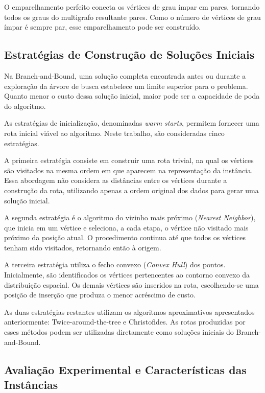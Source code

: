 \documentclass[12pt]{article}
\begin{document}
O emparelhamento perfeito conecta os vértices de grau ímpar em pares,
tornando todos os graus do multigrafo resultante pares. Como o número
de vértices de grau ímpar é sempre par, esse emparelhamento pode ser
construído.




\subsection{Estratégias de Construção de Soluções Iniciais}

Na Branch-and-Bound, uma solução completa encontrada antes ou durante
a exploração da árvore de busca estabelece um limite superior para
o problema. Quanto menor o custo dessa solução inicial, maior pode
ser a capacidade de poda do algoritmo.

As estratégias de inicialização,  denominadas \textit{warm
starts}, permitem fornecer uma rota inicial viável ao algoritmo.
Neste trabalho, são consideradas cinco estratégias.

A primeira estratégia consiste em construir uma rota trivial, na qual os vértices são visitados na mesma ordem em que aparecem na representação da instância. Essa abordagem não considera as distâncias entre os vértices durante a construção da rota, utilizando apenas a ordem original dos dados para gerar uma solução inicial.

A segunda estratégia é o algoritmo do vizinho mais próximo
(\textit{Nearest Neighbor}), que inicia em um vértice e seleciona,
a cada etapa, o vértice não visitado mais próximo da posição atual.
O procedimento continua até que todos os vértices tenham sido
visitados, retornando então à origem.

A terceira estratégia utiliza o fecho convexo (\textit{Convex Hull})
dos pontos. Inicialmente, são identificados os vértices pertencentes
ao contorno convexo da distribuição espacial. Os demais vértices
são inseridos  na rota, escolhendo-se uma posição
de inserção que produza o menor acréscimo de custo.

As duas estratégias restantes utilizam os algoritmos aproximativos
apresentados anteriormente: Twice-around-the-tree e Christofides.
As rotas produzidas por esses métodos podem ser utilizadas diretamente
como soluções iniciais do Branch-and-Bound.

\subsection{Avaliação Experimental e Características das Instâncias}
\end{document}
